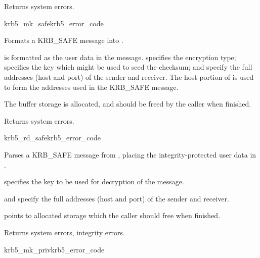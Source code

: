 Returns system errors.

\begin{funcdecl}{krb5_mk_safe}{krb5_error_code}{\funcin}
\funcout
{}
\end{funcdecl}

Formats a KRB_SAFE message into .

 is formatted as the user data in the message.
 specifies the encryption type; 
specifies the key which might be used to seed the checksum;
 and  specify the full
addresses (host and port) of the sender and receiver.  The host portion
of  is used to form the addresses used in the
KRB_SAFE message.

The  buffer storage is allocated, and should be freed by the
caller when finished.

Returns system errors.

\begin{funcdecl}{krb5_rd_safe}{krb5_error_code}{\funcin}
\funcout
{}
\end{funcdecl}

Parses a KRB_SAFE message from , placing the
integrity-protected user data in .

 specifies the key to be used for decryption of the message.
 
 and  specify the full
addresses (host and port) of the sender and receiver.

 points to allocated storage which the caller should
free when finished.

Returns system errors, integrity errors.

\begin{funcdecl}{krb5_mk_priv}{krb5_error_code}{\funcin}
\funcout
{}
\end{funcdecl}

